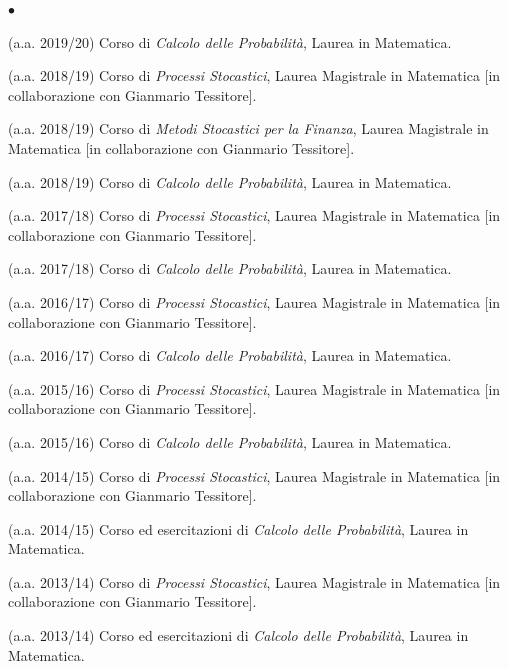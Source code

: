 \documentclass[a4paper,11pt,oneside]{amsart}
\newenvironment{myitemize}{%
\begin{list}{$\bullet$}%
 	{%
	\setlength{\itemsep}{0.3em}%
	\setlength{\topsep}{0.3em}%
	\setlength{\partopsep}{0em}%
	\setlength{\parsep}{0em}%
	\setlength{\parskip}{0em}%
	\setlength\leftmargin{1.5em}%
	\setlength\labelwidth{1.1em}%
	\setlength{\labelsep}{0.4em}%
	}%
	}%
{\end{list}}
\renewenvironment{itemize}{
\begin{myitemize}}%
{\end{myitemize}}
\begin{document}
\begin{itemize}
\item (a.a. 2019/20)
Corso di \textit{Calcolo delle Probabilità},
Laurea in Matematica.

\item (a.a. 2018/19)
Corso di \textit{Processi Stocastici},
Laurea Magistrale in Matematica
[in collaborazione con Gianmario Tessitore].

\item (a.a. 2018/19)
Corso di \textit{Metodi Stocastici per la Finanza},
Laurea Magistrale in Matematica
[in collaborazione con Gianmario Tessitore].

\item (a.a. 2018/19)
Corso di \textit{Calcolo delle Probabilità},
Laurea in Matematica.

\item (a.a. 2017/18)
Corso di \textit{Processi Stocastici},
Laurea Magistrale in Matematica
[in collaborazione con Gianmario Tessitore].

\item (a.a. 2017/18)
Corso di \textit{Calcolo delle Probabilità},
Laurea in Matematica.

\item (a.a. 2016/17)
Corso di \textit{Processi Stocastici},
Laurea Magistrale in Matematica
[in collaborazione con Gianmario Tessitore].

\item (a.a. 2016/17)
Corso di \textit{Calcolo delle Probabilità},
Laurea in Matematica.

\item (a.a. 2015/16)
Corso di \textit{Processi Stocastici},
Laurea Magistrale in Matematica
[in collaborazione con Gianmario Tessitore].

\item (a.a. 2015/16)
Corso di \textit{Calcolo delle Probabilità},
Laurea in Matematica.

\item (a.a. 2014/15)
Corso di \textit{Processi Stocastici},
Laurea Magistrale in Matematica
[in collaborazione con Gianmario Tessitore].

\item (a.a. 2014/15)
Corso ed esercitazioni di \textit{Calcolo delle Probabilità},
Laurea in Matematica.

\item (a.a. 2013/14)
Corso di \textit{Processi Stocastici},
Laurea Magistrale in Matematica
[in collaborazione con Gianmario Tessitore].

\item (a.a. 2013/14)
Corso ed esercitazioni di \textit{Calcolo delle Probabilità},
Laurea in Matematica.


\end{itemize}
\end{document}

